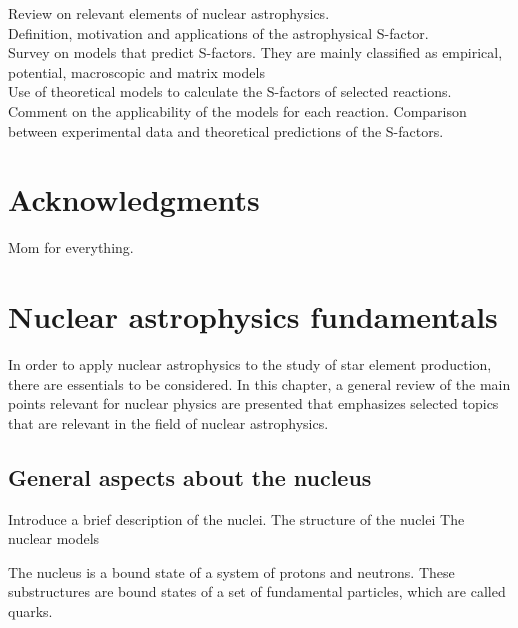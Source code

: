 \documentclass[openany]{book}
\begin{document}
Review on relevant elements of nuclear astrophysics. \\

Definition, motivation and applications of the astrophysical S-factor. \\

Survey on models that predict S-factors. They are mainly classified as empirical, potential, macroscopic and matrix models \\

Use of theoretical models to calculate the S-factors of selected reactions. \\

Comment on the applicability of the models for each reaction. Comparison between experimental data and theoretical predictions of the S-factors.

\clearpage

\chapter*{Acknowledgments}

Mom for everything.

\clearpage

\tableofcontents
\listoffigures
\listoftables



\chapter{Nuclear astrophysics fundamentals}  \label{ch:nuclearAstrophysics}

In order to apply nuclear astrophysics to the study of star element production, there are essentials to be considered. In this chapter, a general review of the main points relevant for nuclear physics are presented that emphasizes selected topics that are relevant in the field of nuclear astrophysics.

\section{General aspects about the nucleus}
Introduce a brief description of the nuclei.
\indent The structure of the nuclei
\indent The nuclear models

The nucleus is a bound state of a system of protons and neutrons. These substructures are bound states of a set of fundamental particles, which are called quarks.  \\
\end{document}
